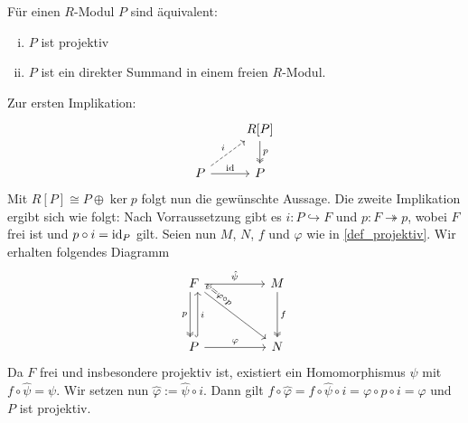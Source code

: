 \begin{satz}[{name=[Projektive Moduln als direkte Summanden in freien Moduln]}]
	Für einen $R$-Modul $P$ sind äquivalent:
	\begin{enumerate}[i),itemsep=0pt]
		\item $P$ ist projektiv
		\item $P$ ist ein direkter Summand in einem freien $R$-Modul.
	\end{enumerate}
\end{satz}
\begin{beweis}
	Zur ersten Implikation:
	\[
		\begin{tikzcd}
			\mbox{}&  R[P] \dar[two heads,"p"] \\
			P \rar["\id"] \urar[dashed,"i"]& P
		\end{tikzcd}
	\]
	Mit $R[P] \cong P \oplus \ker p$ folgt nun die gewünschte Aussage.
	Die zweite Implikation ergibt sich wie folgt: Nach Vorraussetzung gibt es $i \colon P \hookrightarrow F$ und $p \colon F \twoheadrightarrow p$, wobei $F$ frei ist und $p \circ i = \operatorname{id}_P$ gilt.
	Seien nun $M$, $N$, $f$ und $\varphi$ wie in \autoref{def_projektiv}.
	Wir erhalten folgendes Diagramm
	\[
		\begin{tikzcd}[sep=huge]
			F \rar["\hat{\psi}"] \dar[two heads,"p"',xshift=-3pt]  \drar["\psi=\varphi \circ p",sloped,pos=0.16] & M \dar[two heads,"f"] \\
			P \rar["\varphi"] \uar[hook,"i"',xshift=3pt] & N
		\end{tikzcd}
	\]
	Da $F$ frei und insbesondere projektiv ist, existiert ein Homomorphismus $\hat{\psi}$ mit $f \circ \hat{\psi}=\psi$.
	Wir setzen nun $\hat{\varphi} := \hat{\psi} \circ i$. 
	Dann gilt $f \circ \hat{\varphi} = f \circ \hat{\psi} \circ i = \varphi \circ p \circ i = \varphi$ und $P$ ist projektiv.
\end{beweis}

